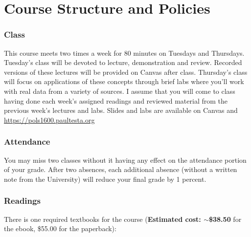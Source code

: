 \part*{Course Structure and Policies}

\section{Class}


This course meets two times a week for 80 minutes on Tuesdays and Thursdays. Tuesday's class will be devoted to lecture, demonstration and review. Recorded versions of these lectures will be provided on Canvas after class. Thursday's class will focus on applications of these concepts through brief labs where you'll work with real data from a variety of sources. I assume that you will come to class having done each week's assigned readings and reviewed material from the previous week's lectures and labs. Slides and labs are available on Canvas and \url{https://pols1600.paultesta.org}

\section{Attendance}

You may miss two classes without it having any effect on the attendance portion of your grade. After two absences, each additional absence (without a written note from the University) will reduce your final grade by 1 percent.


\section{Readings}

There is one required textbooks for the course (\textbf{Estimated cost: $\sim$\$38.50} for the ebook, \$55.00 for the paperback):

